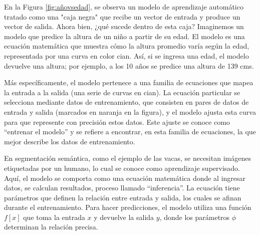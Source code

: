 	
	En la Figura \ref{fig:añovsedad}, se observa un modelo de aprendizaje automático tratado como una "caja negra" que recibe un vector de entrada y produce un vector de salida. Ahora bien, ¿qué sucede dentro de esta caja? Imaginemos un modelo que predice la altura de un niño a partir de su edad. El modelo es una ecuación matemática que muestra cómo la altura promedio varía según la edad, representada por una curva en color cian. Así, si se ingresa una edad, el modelo devuelve una altura; por ejemplo, a los 10 años se predice una altura de 139 cms.
	
	Más específicamente, el modelo pertenece a una familia de ecuaciones que mapea la entrada a la salida (una serie de curvas en cian). La ecuación particular se selecciona mediante datos de entrenamiento, que consisten en pares de datos de entrada y salida (marcados en naranja en la figura), y el modelo ajusta esta curva para que represente con precisión estos datos. Este ajuste se conoce como “entrenar el modelo” y se refiere a encontrar, en esta familia de ecuaciones, la que mejor describe los datos de entrenamiento.
	
	En segmentación semántica, como el ejemplo de las vacas, se necesitan imágenes etiquetadas por un humano, lo cual se conoce como aprendizaje supervisado. Aquí, el modelo se comporta como una ecuación matemática donde al ingresar datos, se calculan resultados, proceso llamado “inferencia”. La ecuación tiene parámetros que definen la relación entre entrada y salida, los cuales se afinan durante el entrenamiento. Para hacer predicciones, el modelo utiliza una función $f[x]$ que toma la entrada $x$ y devuelve la salida $y$, donde los parámetros $\phi$ determinan la relación precisa.
	

